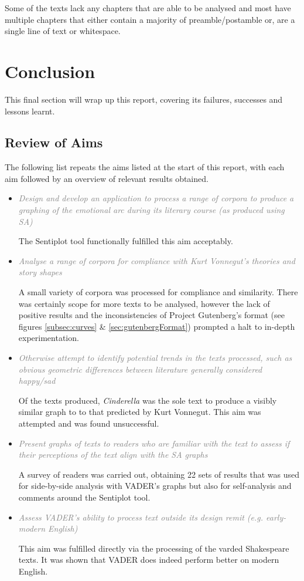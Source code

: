 \documentclass{article}
\begin{document}
        Some of the texts lack any chapters that are able to be analysed and most have multiple chapters that either contain a majority of preamble/postamble or, are a single line of text or whitespace.
\newpage
\section{Conclusion}
    This final section will wrap up this report, covering its failures, successes and lessons learnt.
    \subsection{Review of Aims}
        The following list repeats the aims listed at the start of this report, with each aim followed by an overview of relevant results obtained.
        \begin{itemize}
            \item \textcolor{gray}{\textit{Design and develop an application to process a range of corpora to produce a graphing of the emotional arc during its literary course (as produced using SA)}}
            
            The Sentiplot tool functionally fulfilled this aim acceptably.

            \item \textcolor{gray}{\textit{Analyse a range of corpora for compliance with Kurt Vonnegut’s theories and story shapes}}
            
            A small variety of corpora was processed for compliance and similarity. There was certainly scope for more texts to be analysed, however the lack of positive results and the inconsistencies of Project Gutenberg's format (see figures \ref{subsec:curves} \& \ref{sec:gutenbergFormat}) prompted a halt to in-depth experimentation.
            \item \textcolor{gray}{\textit{Otherwise attempt to identify potential trends in the texts processed, such as obvious geometric differences between literature generally considered happy/sad}}
            
            Of the texts produced, \textit{Cinderella} was the sole text to produce a visibly similar graph to to that predicted by Kurt Vonnegut. This aim was attempted and was found unsuccessful.
            \item \textcolor{gray}{\textit{Present graphs of texts to readers who are familiar with the text to assess if their perceptions of the text align with the SA graphs}}
            
            A survey of readers was carried out, obtaining 22 sets of results that was used for side-by-side analysis with VADER's graphs but also for self-analysis and comments around the Sentiplot tool.
            \item \textcolor{gray}{\textit{Assess VADER's ability to process text outside its design remit (e.g. early-modern English)}}
            
            This aim was fulfilled directly via the processing of the varded Shakespeare texts. It was shown that VADER does indeed perform better on modern English.
        \end{itemize}
\end{document}
